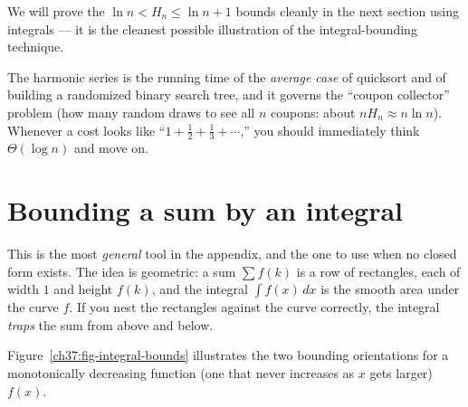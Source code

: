We will prove the $\ln n < H_n \le \ln n + 1$ bounds cleanly in the next section
using integrals --- it is the cleanest possible illustration of the
integral-bounding technique.

\begin{aestheticbox}
The harmonic series is the running time of the \emph{average case} of quicksort
and of building a randomized binary search tree, and it governs the ``coupon
collector'' problem (how many random draws to see all $n$ coupons: about
$n H_n \approx n\ln n$). Whenever a cost looks like ``$1 + \tfrac12 + \tfrac13 +
\cdots$,'' you should immediately think $\Theta(\log n)$ and move on.
\end{aestheticbox}

\section{Bounding a sum by an integral}
\label{ch37:integral-bounds}

This is the most \emph{general} tool in the appendix, and the one to use
when no closed form exists. The idea is geometric: a sum $\sum f(k)$ is a row of rectangles, each of width $1$
and height $f(k)$, and the integral $\int f(x)\,dx$ is the smooth area under the
curve $f$. If you nest the rectangles against the curve correctly, the integral
\emph{traps} the sum from above and below.

Figure~\ref{ch37:fig-integral-bounds} illustrates the two bounding orientations
for a monotonically decreasing function (one that never increases as $x$ gets larger) $f(x)$.


